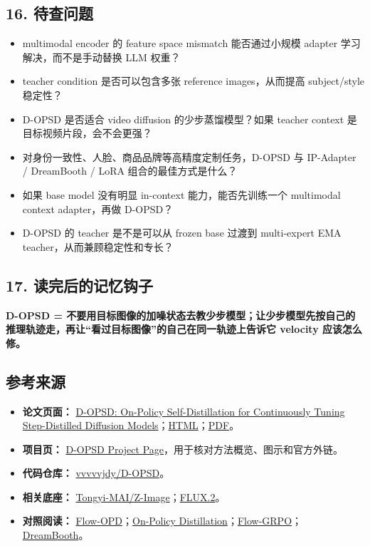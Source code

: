 \subsection{16. 待查问题}

\begin{itemize}[leftmargin=1.5em]
  \item multimodal encoder 的 feature space mismatch 能否通过小规模 adapter 学习解决，而不是手动替换 LLM 权重？
  \item teacher condition 是否可以包含多张 reference images，从而提高 subject/style 稳定性？
  \item D-OPSD 是否适合 video diffusion 的少步蒸馏模型？如果 teacher context 是目标视频片段，会不会更强？
  \item 对身份一致性、人脸、商品品牌等高精度定制任务，D-OPSD 与 IP-Adapter / DreamBooth / LoRA 组合的最佳方式是什么？
  \item 如果 base model 没有明显 in-context 能力，能否先训练一个 multimodal context adapter，再做 D-OPSD？
  \item D-OPSD 的 teacher 是不是可以从 frozen base 过渡到 multi-expert EMA teacher，从而兼顾稳定性和专长？
\end{itemize}

\subsection{17. 读完后的记忆钩子}

\begin{intubox}
\textbf{D-OPSD = 不要用目标图像的加噪状态去教少步模型；让少步模型先按自己的推理轨迹走，再让“看过目标图像”的自己在同一轨迹上告诉它 velocity 应该怎么修。}
\end{intubox}

\subsection{参考来源}

\begin{itemize}[leftmargin=1.5em]
  \item \textbf{论文页面：} \href{https://arxiv.org/abs/2605.05204}{D-OPSD: On-Policy Self-Distillation for Continuously Tuning Step-Distilled Diffusion Models}；\href{https://arxiv.org/html/2605.05204v1}{HTML}；\href{https://arxiv.org/pdf/2605.05204}{PDF}。
  \item \textbf{项目页：} \href{https://vvvvvjdy.github.io/d-opsd}{D-OPSD Project Page}，用于核对方法概览、图示和官方外链。
  \item \textbf{代码仓库：} \href{https://github.com/vvvvvjdy/D-OPSD}{vvvvvjdy/D-OPSD}。
  \item \textbf{相关底座：} \href{https://github.com/Tongyi-MAI/Z-Image}{Tongyi-MAI/Z-Image}；\href{https://blackforestlabs.ai/flux-2}{FLUX.2}。
  \item \textbf{对照阅读：} \href{https://arxiv.org/abs/2605.08063}{Flow-OPD}；\href{https://thinkingmachines.ai/blog/on-policy-distillation}{On-Policy Distillation}；\href{https://arxiv.org/abs/2505.05470}{Flow-GRPO}；\href{https://arxiv.org/abs/2208.12242}{DreamBooth}。
\end{itemize}
